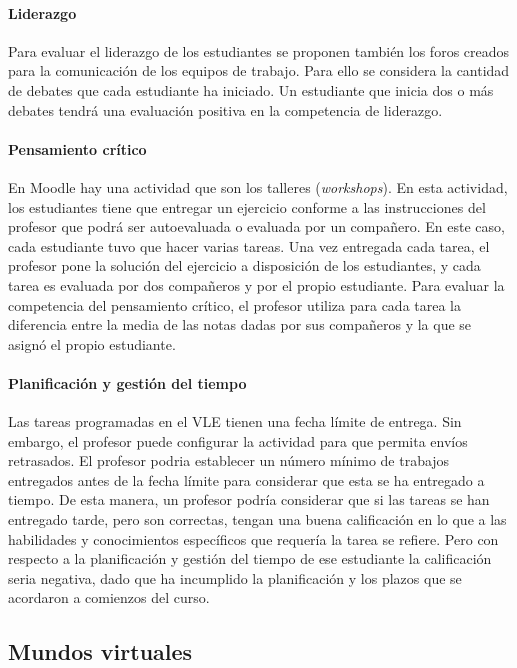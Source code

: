 \paragraph*{Liderazgo}
Para evaluar el liderazgo de los estudiantes se proponen también los foros creados para la comunicación de los equipos de trabajo. Para ello se considera la cantidad de debates que cada estudiante ha iniciado. Un estudiante que inicia dos o más debates tendrá una evaluación positiva en la competencia de liderazgo.

\paragraph*{Pensamiento crítico}
En Moodle hay una actividad que son los talleres (\emph{workshops}). En esta actividad, los estudiantes tiene que entregar un ejercicio conforme a las instrucciones del profesor que podrá ser autoevaluada o evaluada por un compañero. En este caso, cada estudiante tuvo que hacer varias tareas. Una vez entregada cada tarea, el profesor pone la solución del ejercicio a disposición de los estudiantes, y cada tarea es evaluada por dos compañeros y por el propio estudiante. Para evaluar la competencia del pensamiento crítico, el profesor utiliza para cada tarea la diferencia entre la media de las notas dadas por sus compañeros y la que se asignó el propio estudiante.

\paragraph*{Planificación y gestión del tiempo}
Las tareas programadas en el VLE tienen una fecha límite de entrega. Sin embargo, el profesor puede configurar la actividad para que permita envíos retrasados. El profesor podria establecer un número mínimo de trabajos entregados antes de la fecha límite para considerar que esta se ha entregado a tiempo. De esta manera, un profesor podría considerar que si las tareas se han entregado tarde, pero son correctas, tengan una buena calificación en lo que a las habilidades y conocimientos específicos que requería la tarea se refiere. Pero con respecto a la planificación y gestión del tiempo de ese estudiante la calificación seria negativa, dado que ha incumplido la planificación y los plazos que se acordaron a comienzos del curso.

\subsection{Mundos virtuales}

